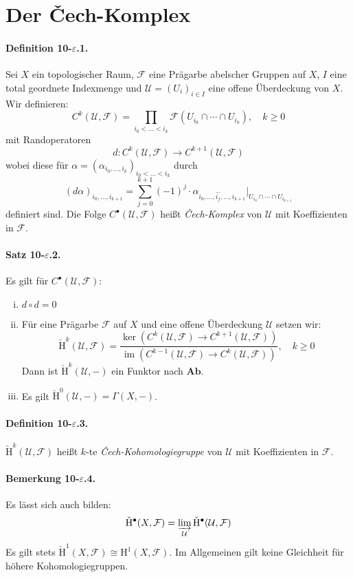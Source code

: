 \section{Der Čech-Komplex}

\paragraph{Definition 10-$\varepsilon$.1.}\label{9.5.1} Sei $X$ ein topologischer Raum, $\mathcal{F}$ eine Prägarbe abelscher Gruppen auf $X$, $I$ eine total geordnete Indexmenge und $\mathcal{U}=(U_i)_{i\in I}$ eine offene Überdeckung von $X$. Wir definieren:
\[C^k(\mathcal{U},\mathcal{F})=\prod_{i_0<\ldots<i_k}\mathcal{F}(U_{i_0}\cap\cdots\cap U_{i_k}),\quad k\geq 0 \]
mit Randoperatoren
\[d: C^k(\mathcal{U},\mathcal{F})\to C^{k+1}(\mathcal{U},\mathcal{F}) \]
wobei diese für $\alpha=(\alpha_{i_0,\ldots,i_k})_{i_0<\ldots<i_k}$ durch
\[(d\alpha)_{i_0,\ldots,i_{k+1}} = \sum_{j=0}^{k+1} (-1)^j \cdot\alpha_{i_0,\ldots,\widehat{i_j},\ldots,i_{k+1}}|_{U_{i_0}\cap\cdots\cap U_{i_{k+1}}} \]
definiert sind. Die Folge $C^\bullet(\mathcal{U},\mathcal{F})$ heißt \textit{Čech-Komplex} von $\mathcal{U}$ mit Koeffizienten in $\mathcal{F}$.

\paragraph{Satz 10-$\varepsilon$.2.}\label{9.5.2} Es gilt für $C^\bullet(\mathcal{U},\mathcal{F})$:
\begin{enumerate}[(i)]
\item $d\circ d =0$
\item Für eine Prägarbe $\mathcal{F}$ auf $X$ und eine offene Überdeckung $\mathcal{U}$ setzen wir:
\[\check{\mathrm{H}}^k(\mathcal{U},\mathcal{F}) = \frac{\ker( C^k(\mathcal{U},\mathcal{F})\to C^{k+1}(\mathcal{U},\mathcal{F}) )}{\operatorname{im}(C^{k-1}(\mathcal{U},\mathcal{F})\to C^{k}(\mathcal{U},\mathcal{F}))},\quad k\geq 0 \]
Dann ist $\check{\mathrm{H}}^k(\mathcal{U},-)$ ein Funktor nach $\mathbf{Ab}$.
\item Es gilt $\check{\mathrm{H} }^0(\mathcal{U},-)=\Gamma(X,-)$.
\end{enumerate}

\paragraph{Definition 10-$\varepsilon$.3.}\label{9.5.3} $\check{\mathrm{H}}^k(\mathcal{U},\mathcal{F})$ heißt $k$-te \textit{Čech-Kohomologiegruppe} von $\mathcal{U}$ mit Koeffizienten in $\mathcal{F}$.

\paragraph{Bemerkung 10-$\varepsilon$.4.}\label{9.5.4} Es lässt sich auch bilden:
\[\check{\mathrm{H}}^\bullet(X,\mathcal{F}) = \varinjlim_{\mathcal{U}}\check{\mathrm{H}}^\bullet(\mathcal{U},\mathcal{F}) \]
Es gilt stets $\check{\mathrm{H}}^1(X,\mathcal{F})\cong \mathrm{H}^1(X,\mathcal{F})$. Im Allgemeinen gilt keine Gleichheit für höhere Kohomologiegruppen.

